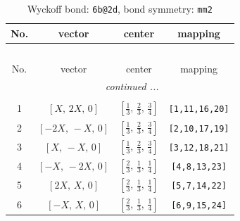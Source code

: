 \documentclass[fleqn,8pt]{jsarticle}
\begin{document}
\renewcommand{\arraystretch}{1.2}
\begin{longtable}{cccc}
\caption{Wyckoff bond: {\tt 6b@2d}, bond symmetry: {\tt mm2}}
 \\
 \hline \hline
No. & vector & center & mapping \\ \hline \endfirsthead

\multicolumn{3}{l}{\tablename\ \thetable{}} \\
 \hline \hline
No. & vector & center & mapping \\ \hline \endhead

 \hline \hline
\multicolumn{3}{r}{\footnotesize\it continued ...} \\ \endfoot

 \hline \hline
\multicolumn{3}{r}{} \\ \endlastfoot

1 & $\left[ X,\, 2 X,\, 0 \right]$ & $\left[ \frac{1}{3},\, \frac{2}{3},\, \frac{3}{4} \right]$ & {\tt [1,11,16,20]} \\ \hline
2 & $\left[ - 2 X,\, - X,\, 0 \right]$ & $\left[ \frac{1}{3},\, \frac{2}{3},\, \frac{3}{4} \right]$ & {\tt [2,10,17,19]} \\ \hline
3 & $\left[ X,\, - X,\, 0 \right]$ & $\left[ \frac{1}{3},\, \frac{2}{3},\, \frac{3}{4} \right]$ & {\tt [3,12,18,21]} \\ \hline
4 & $\left[ - X,\, - 2 X,\, 0 \right]$ & $\left[ \frac{2}{3},\, \frac{1}{3},\, \frac{1}{4} \right]$ & {\tt [4,8,13,23]} \\ \hline
5 & $\left[ 2 X,\, X,\, 0 \right]$ & $\left[ \frac{2}{3},\, \frac{1}{3},\, \frac{1}{4} \right]$ & {\tt [5,7,14,22]} \\ \hline
6 & $\left[ - X,\, X,\, 0 \right]$ & $\left[ \frac{2}{3},\, \frac{1}{3},\, \frac{1}{4} \right]$ & {\tt [6,9,15,24]} \\
\end{longtable}
\renewcommand{\arraystretch}{1.2}
\end{document}
